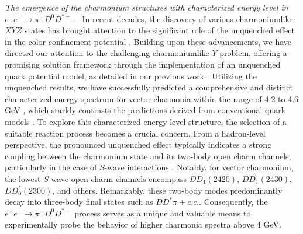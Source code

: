 \documentclass[prl,twocolumn,floatfix,amsmath,nofootinbib,amssymb,floatfix]{revtex4}
\begin{document}
{\noindent\it The emergence of the charmonium structures with characterized energy level in $e^+e^-\to \pi^+ D^0 D^{*-}$}.---In recent decades, the discovery of various charmoniumlike $XYZ$ states has brought attention to the significant role of the unquenched effect in the color confinement potential \cite{Chen:2016qju}. 
Building upon these advancements, we have directed our attention to the challenging charmoniumlike $Y$ problem, offering a promising solution framework through the implementation of an unquenched quark potential model, as detailed in our previous work \cite{Wang:2019mhs}. Utilizing the unquenched results, we have successfully predicted a comprehensive and distinct characterized energy spectrum for vector charmonia within the range of 4.2 to 4.6 GeV \cite{Wang:2019mhs}, which starkly contrasts the predictions derived from conventional quark models \cite{Eichten:1974af,Eichten:1978tg}. To explore this characterized energy level structure, the selection of a suitable reaction process becomes a crucial concern. From a hadron-level perspective, the pronounced unquenched effect typically indicates a strong coupling between the charmonium state and its two-body open charm channels, particularly in the case of $S$-wave interactions \cite{Eichten:1978tg,vanBeveren:1983td,Li:2009ad,Kalashnikova:2005ui,Pennington:2007xr}. Notably, for vector charmonium, the lowest $S$-wave open charm channels encompass $DD_1(2420)$, $DD_1(2430)$, $DD_0^*(2300)$, and others. Remarkably, these two-body modes predominantly decay into three-body final states such as $DD^*\pi+c.c.$. Consequently, the $e^+e^-\to \pi^+ D^0 D^{*-}$ process serves as a unique and valuable means to experimentally probe the behavior of higher charmonia spectra above 4 GeV.
\end{document}
